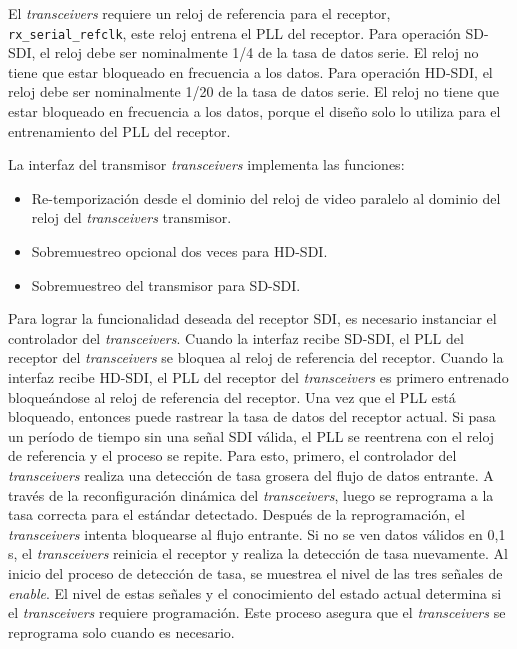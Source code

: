   El \textit{transceivers} requiere un reloj de referencia para el receptor,
  \texttt{rx\_serial\_refclk}, este reloj entrena el PLL del receptor.
  Para operación SD-SDI, el reloj debe ser nominalmente 1/4 de la tasa de datos
  serie. El reloj no tiene que estar bloqueado en frecuencia a los datos.
  Para operación HD-SDI, el reloj debe ser nominalmente 1/20 de la tasa de datos
  serie. El reloj no tiene que estar bloqueado en frecuencia a los datos, porque
  el diseño solo lo utiliza para el entrenamiento del PLL del receptor.

  La interfaz del transmisor \textit{transceivers} implementa las funciones:
  \begin{itemize}
      \item Re-temporización desde el dominio del reloj de video paralelo al
      dominio del reloj del \textit{transceivers} transmisor.
      \item Sobremuestreo opcional dos veces para HD-SDI\@.
      \item Sobremuestreo del transmisor para SD-SDI\@.
  \end{itemize}

  Para lograr la funcionalidad deseada del receptor SDI, es necesario
  instanciar el controlador del \textit{transceivers}.
  Cuando la interfaz recibe SD-SDI, el PLL del receptor del \textit{transceivers}
  se bloquea al reloj de referencia del receptor.
  Cuando la interfaz recibe HD-SDI, el PLL del receptor del \textit{transceivers}
  es primero entrenado bloqueándose al reloj de referencia del receptor. Una vez
  que el PLL está bloqueado, entonces puede rastrear la tasa de datos del receptor
  actual. Si pasa un período de tiempo sin una señal SDI válida, el PLL se
  reentrena con el reloj de referencia y el proceso se repite.
  Para esto, primero, el controlador del \textit{transceivers} realiza una
  detección de tasa grosera del flujo de datos entrante. A través de la
  reconfiguración dinámica del \textit{transceivers}, luego se reprograma a la
  tasa correcta para el estándar detectado. Después de la reprogramación, el
  \textit{transceivers} intenta bloquearse al flujo entrante. Si no se ven datos
  válidos en 0,1 s, el \textit{transceivers} reinicia el receptor y realiza la
  detección de tasa nuevamente.
  Al inicio del proceso de detección de tasa, se muestrea el nivel de las tres
  señales de \textit{enable}. El nivel de estas señales y el conocimiento del
  estado actual determina si el \textit{transceivers} requiere programación. Este
  proceso asegura que el \textit{transceivers} se reprograma solo cuando es necesario.


